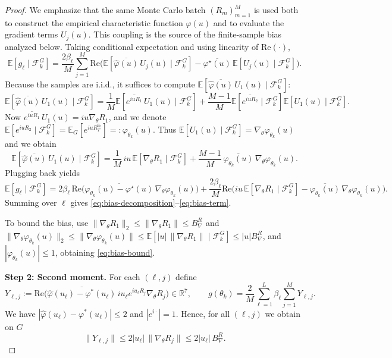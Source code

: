 \documentclass[reqno, 11pt]{amsart}%
\newcommand\cF{\mathcal F}
\newcommand\EE{\mathbb E}
\newcommand\RR{\mathbb R}
\theoremstyle{definition}
\begin{document}
\begin{proof}
We emphasize that the same Monte Carlo batch
$(R_m)_{m=1}^M$ is used both to construct the empirical characteristic function
$\widehat\varphi(u)$ and to evaluate the gradient terms $U_j(u)$.
This coupling is the source of the finite-sample bias analyzed below. Taking conditional expectation and using linearity of $\text{Re}(\cdot)$,
\[
\EE[g_\ell\mid \cF_k^G]
=
\frac{2\beta_\ell}{M}\sum_{j=1}^M
\text{Re}\Big(\EE[\overline{\widehat\varphi(u)}\,U_j(u)\mid \cF_k^G]
-\overline{\varphi^\star(u)}\,\EE[U_j(u)\mid \cF_k^G]\Big).
\]
Because the samples are i.i.d., it suffices to compute $\EE[\overline{\widehat\varphi(u)}\,U_1(u)\mid \cF_k^G]$:
\[
\EE[\overline{\widehat\varphi(u)}\,U_1(u)\mid \cF_k^G]
=
\frac1M\EE[\overline{e^{iu R_1}}\,U_1(u)\mid \cF_k^G]
+\frac{M-1}{M}\EE[\overline{e^{iu R_2}}\mid \cF_k^G]\EE[U_1(u)\mid \cF_k^G].
\]
Now $\overline{e^{iu R_1}}\,U_1(u)= iu \nabla_\theta R_1$,
and we denote $\EE[{e^{iu R_2}}\mid \cF_k^G]=\EE_G[{e^{iu R_T^{\theta_k}}}] =:{\varphi_{\theta_k}(u)}$.
Thus $\EE[U_1(u)\mid \cF_k^G]=\nabla_\theta\varphi_{\theta_k}(u)$
and we obtain
\[
\EE[\overline{\widehat\varphi(u)}\,U_1(u)\mid \cF_k^G]
=
\frac1M\,iu\,\EE[\nabla_\theta R_1\mid \cF_k^G]
+\frac{M-1}{M}\,\overline{\varphi_{\theta_k}(u)}\,\nabla_\theta\varphi_{\theta_k}(u).
\]
Plugging back yields
\[
\EE[g_\ell\mid \cF_k^G]
=
2\beta_\ell\,\text{Re}\Big(\overline{\varphi_{\theta_k}(u)-\varphi^\star(u)}\,\nabla_\theta\varphi_{\theta_k}(u)\Big)
+\frac{2\beta_\ell}{M}\text{Re}\Big(iu\,\EE[\nabla_\theta R_1\mid \cF_k^G]-\overline{\varphi_{\theta_k}(u)}\,\nabla_\theta\varphi_{\theta_k}(u)\Big).
\]
Summing over $\ell$ gives \eqref{eq:bias-decomposition}--\eqref{eq:bias-term}.

To bound the bias, use $\|\nabla_\theta R_1\|_2\le \|\nabla_\theta R_1\|\le B_\nabla^R$ and
$\|\nabla_\theta\varphi_{\theta_k}(u)\|_2
\le \|\nabla_\theta\varphi_{\theta_k}(u)\|
\le \EE[|u|\,\|\nabla_\theta R_1\|\mid \cF_k^G ]\le |u| B_\nabla^R$,
and $|\varphi_{\theta_k}(u)|\le 1$, obtaining \eqref{eq:bias-bound}.

\medskip
\noindent\textbf{Step 2: Second moment.}
For each $(\ell,j)$ define
\[
Y_{\ell,j}
:=\mathrm{Re}\Big(\overline{\hat{\varphi}(u_\ell)-\varphi^*(u_\ell)}\,iu_\ell e^{iu_\ell R_j}\nabla_\theta R_j\Big)\in\RR^7,
\qquad
g(\theta_k)=\frac{2}{M}\sum_{\ell=1}^{L}\beta_\ell\sum_{j=1}^M Y_{\ell,j}.
\]
We have
$|\hat{\varphi}(u_\ell)-\varphi^*(u_\ell)|\le  2$
and $|e^{i\cdot}|=1$. Hence, for all $(\ell,j)$ we obtain on  $G$
\begin{equation}\label{eq:Y-bound}
\|Y_{\ell,j}\|
\le 2|u_\ell|\,\|\nabla_\theta R_j\|
\le 2|u_\ell|\,B_\nabla^R.
\end{equation}


\end{proof}
\end{document}
